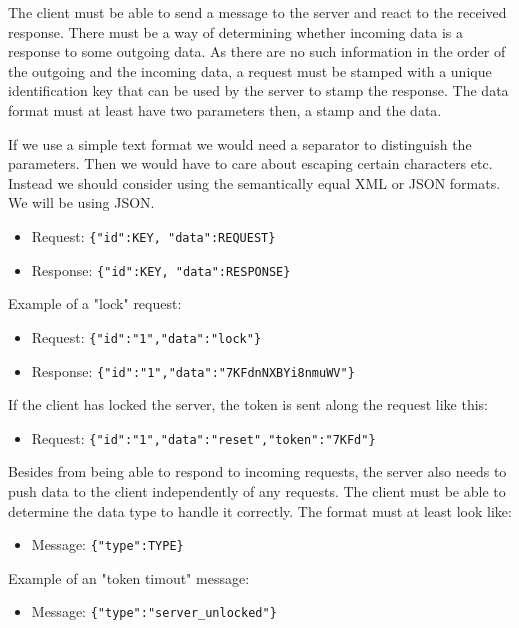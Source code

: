 The client must be able to send a message to the server and react to the received response. There must be a way of determining whether incoming data is a response to some outgoing data. As there are no such information in the order of the outgoing and the incoming data, a request must be stamped with a unique identification key that can be used by the server to stamp the response. The data format must at least have two parameters then, a stamp and the data.

If we use a simple text format we would need a separator to distinguish the parameters. Then we would have to care about escaping certain characters etc. Instead we should consider using the semantically equal XML or JSON formats. We will be using JSON.

\begin{itemize}
	\item Request: \texttt{\{"id":KEY, "data":REQUEST\}}
	\item Response: \texttt{\{"id":KEY, "data":RESPONSE\}}
\end{itemize}
Example of a "lock" request:
\begin{itemize}
	\item Request: \texttt{\{"id":"1","data":"lock"\}}
	\item Response: \texttt{\{"id":"1","data":"7KFdnNXBYi8nmuWV"\}}
\end{itemize}

If the client has locked the server, the token is sent along the request like this:

\begin{itemize}
	\item Request: \texttt{\{"id":"1","data":"reset","token":"7KFd"\}}
\end{itemize}

Besides from being able to respond to incoming requests, the server also needs to push data to the client independently of any requests. The client must be able to determine the data type to handle it correctly. The format must at least look like:

\begin{itemize}
	\item Message: \texttt{\{"type":TYPE\}}
\end{itemize}

Example of an "token timout" message:

\begin{itemize}
	\item Message: \texttt{\{"type":"server\_unlocked"\}}
\end{itemize}

